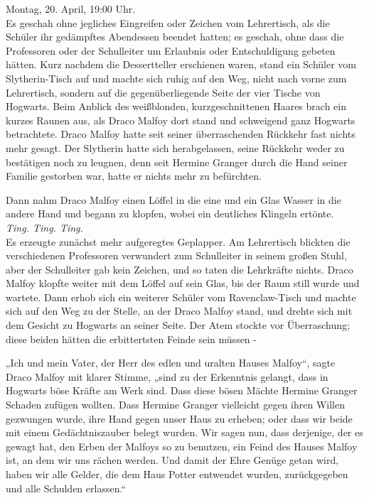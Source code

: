 {Montag, 20. April, 19:00 Uhr.\\ Es geschah ohne jegliches Eingreifen oder Zeichen vom Lehrertisch, als die Schüler ihr gedämpftes Abendessen beendet hatten; es geschah, ohne dass die Professoren oder der Schulleiter um Erlaubnis oder Entschuldigung gebeten hätten. Kurz nachdem die Dessertteller erschienen waren, stand ein Schüler vom Slytherin-Tisch auf und machte sich ruhig auf den Weg, nicht nach vorne zum Lehrertisch, sondern auf die gegenüberliegende Seite der vier Tische von Hogwarts. Beim Anblick des weißblonden, kurzgeschnittenen Haares brach ein kurzes Raunen aus, als Draco Malfoy dort stand und schweigend ganz Hogwarts betrachtete. Draco Malfoy hatte seit seiner überraschenden Rückkehr fast nichts mehr gesagt. Der Slytherin hatte sich herabgelassen, seine Rückkehr weder zu bestätigen noch zu leugnen, denn seit Hermine Granger durch die Hand seiner Familie gestorben war, hatte er nichts mehr zu befürchten.

Dann nahm Draco Malfoy einen Löffel in die eine und ein Glas Wasser in die andere Hand und begann zu klopfen, wobei ein deutliches Klingeln ertönte.\\ \emph{Ting. Ting. Ting.}\\ Es erzeugte zunächst mehr aufgeregtes Geplapper. Am Lehrertisch blickten die verschiedenen Professoren verwundert zum Schulleiter in seinem großen Stuhl, aber der Schulleiter gab kein Zeichen, und so taten die Lehrkräfte nichts. Draco Malfoy klopfte weiter mit dem Löffel auf sein Glas, bis der Raum still wurde und wartete. Dann erhob sich ein weiterer Schüler vom Ravenclaw-Tisch und machte sich auf den Weg zu der Stelle, an der Draco Malfoy stand, und drehte sich mit dem Gesicht zu Hogwarts an seiner Seite. Der Atem stockte vor Überraschung; diese beiden hätten die erbittertsten Feinde sein müssen -

„Ich und mein Vater, der Herr des edlen und uralten Hauses Malfoy“, sagte Draco Malfoy mit klarer Stimme, „sind zu der Erkenntnis gelangt, dass in Hogwarts böse Kräfte am Werk sind. Dass diese bösen Mächte Hermine Granger Schaden zufügen wollten. Dass Hermine Granger vielleicht gegen ihren Willen gezwungen wurde, ihre Hand gegen unser Haus zu erheben; oder dass wir beide mit einem Gedächtniszauber belegt wurden. Wir sagen nun, dass derjenige, der es gewagt hat, den Erben der Malfoys so zu benutzen, ein Feind des Hauses Malfoy ist, an dem wir uns rächen werden. Und damit der Ehre Genüge getan wird, haben wir alle Gelder, die dem Haus Potter entwendet wurden, zurückgegeben und alle Schulden erlassen.“

}
